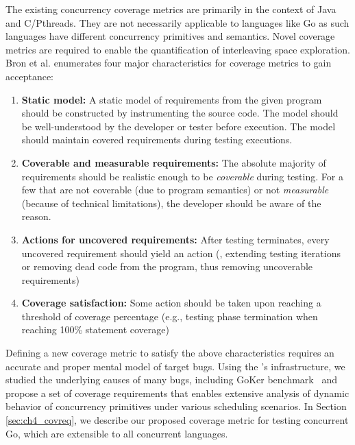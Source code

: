 The existing concurrency coverage metrics are primarily in the context of Java and C/Pthreads.
%
They are not necessarily applicable to languages like Go as such languages have different concurrency primitives and semantics.
%
Novel coverage metrics are required to enable the quantification of interleaving space exploration.
%
Bron et al.\cite{bron-appSyncCov-ppopp05} enumerates four major characteristics for coverage metrics to gain acceptance:
\begin{enumerate}
  \item \textbf{Static model:} A static model of requirements from the given program should be constructed by instrumenting the source code. The model should be well-understood by the developer or tester before execution. The model should maintain covered requirements during testing executions.
  \item \textbf{Coverable and measurable requirements:} The absolute majority of requirements should be realistic enough to be \textit{coverable} during testing. For a few that are not coverable (due to program semantics) or not \textit{measurable} (because of technical limitations), the developer should be aware of the reason.
  \item \textbf{Actions for uncovered requirements:} After testing terminates, every uncovered requirement should yield an action (\eg, extending testing iterations or removing dead code from the program, thus removing uncoverable requirements)
  \item \textbf{Coverage satisfaction:} Some action should be taken upon reaching a threshold of coverage percentage (e.g., testing phase termination when reaching 100\% statement coverage)
\end{enumerate}

Defining a new coverage metric to satisfy the above characteristics requires an accurate and proper mental model of target bugs.
%
Using the \goat's infrastructure, we studied the underlying causes of many bugs, including GoKer benchmark~\cite{yuan-gobench-cgo21} and propose a set of coverage requirements that enables extensive analysis of dynamic behavior of concurrency primitives under various scheduling scenarios.
%
In Section \ref{sec:ch4_covreq}, we describe our proposed coverage metric for testing concurrent Go, which are extensible to all concurrent languages.
